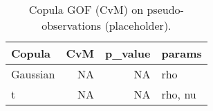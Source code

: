 \begin{table}

\caption{\label{tab:unnamed-chunk-1}Copula GOF (CvM) on pseudo-observations (placeholder).}
\centering
\begin{tabular}[t]{lrrl}
\toprule
Copula & CvM & p\_value & params\\
\midrule
Gaussian & NA & NA & rho\\
t & NA & NA & rho, nu\\
\bottomrule
\end{tabular}
\end{table}
